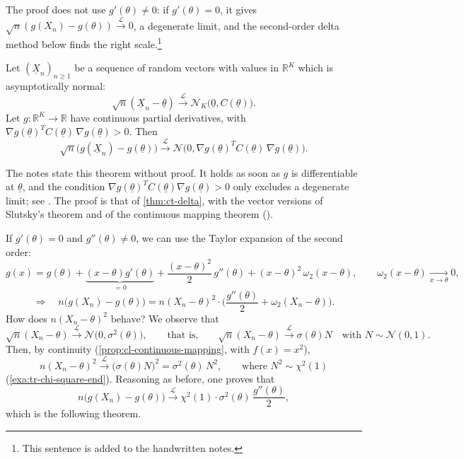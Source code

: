The proof does not use $g'(\theta)\ne0$: if $g'(\theta)=0$, it gives
$\sqrt n(g(X_n)-g(\theta))\xrightarrow{\mathcal L}0$, a degenerate limit, and the second-order
delta method below finds the right scale.\footnote{This sentence is added to the handwritten
notes.}

\begin{theorem}\label{thm:ct-delta-multivariate}
Let $(\underline X_n)_{n\ge1}$ be a sequence of random vectors with values in $\mathbb R^K$ which
is asymptotically normal:
\[
  \sqrt n(\underline X_n-\underline\theta)\xrightarrow{\mathcal L}\mathcal N_K\big(\underline0,C(\underline\theta)\big).
\]
Let $g:\mathbb R^K\to\mathbb R$ have continuous partial derivatives, with
$\nabla g(\underline\theta)^TC(\underline\theta)\,\nabla g(\underline\theta)>0$. Then
\[
  \sqrt n\big(g(\underline X_n)-g(\underline\theta)\big)\xrightarrow{\mathcal L}
  \mathcal N\big(0,\nabla g(\underline\theta)^TC(\underline\theta)\,\nabla g(\underline\theta)\big).
\]
\end{theorem}

The notes state this theorem without proof. It holds as soon as $g$ is differentiable at
$\underline\theta$, and the condition $\nabla g(\underline\theta)^TC(\underline\theta)\nabla
g(\underline\theta)>0$ only excludes a degenerate limit; see \citet[Theorem~3.1]{vandervaart-asymptotic}.
The proof is that of \cref{thm:ct-delta}, with the vector versions of Slutsky's theorem and of the
continuous mapping theorem ().

\begin{remark}[What if $g'(\theta)=0$?]\label{rem:ct-second-order}
If $g'(\theta)=0$ and $g''(\theta)\ne0$, we can use the Taylor expansion of the second order:
\[
  g(x)=g(\theta)+\underbrace{(x-\theta)g'(\theta)}_{=0}+\frac{(x-\theta)^2}2\,g''(\theta)
  +(x-\theta)^2\,\omega_2(x-\theta),\qquad\omega_2(x-\theta)\xrightarrow[x\to\theta]{}0 ,
\]
\[
  \Longrightarrow\quad n\big(g(X_n)-g(\theta)\big)=n(X_n-\theta)^2\cdot
  \Big(\frac{g''(\theta)}2+\omega_2(X_n-\theta)\Big).
\]
How does $n(X_n-\theta)^2$ behave? We observe that
\[
  \sqrt n(X_n-\theta)\xrightarrow{\mathcal L}\mathcal N\big(0,\sigma^2(\theta)\big),\qquad\text{that is,}\qquad
  \sqrt n(X_n-\theta)\xrightarrow{\mathcal L}\sigma(\theta)N\quad\text{with }N\sim\mathcal N(0,1).
\]
Then, by continuity (\cref{prop:cl-continuous-mapping}, with $f(x)=x^2$),
\[
  n(X_n-\theta)^2\xrightarrow{\mathcal L}\big(\sigma(\theta)N\big)^2=\sigma^2(\theta)\,N^2,
  \qquad\text{where }N^2\sim\chi^2(1)
\]
(\cref{exa:tr-chi-square-end}). Reasoning as before, one proves that
\[
  n\big(g(X_n)-g(\theta)\big)\xrightarrow{\mathcal L}\chi^2(1)\cdot\sigma^2(\theta)\,\frac{g''(\theta)}2 ,
\]
which is the following theorem.
\end{remark}

